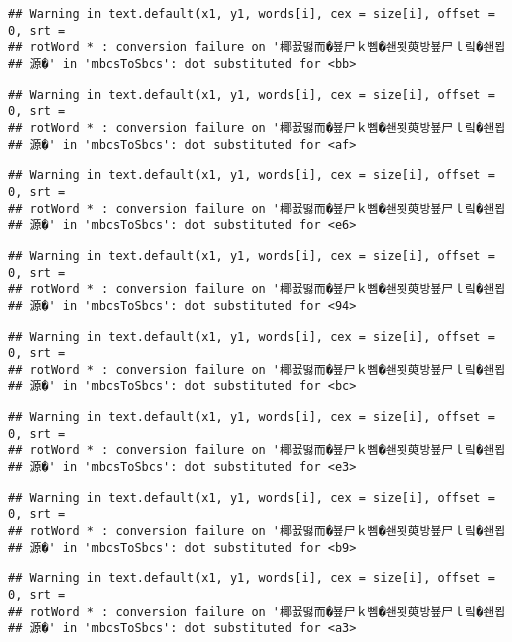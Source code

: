 \documentclass[]{article}
\begin{document}
\begin{verbatim}
## Warning in text.default(x1, y1, words[i], cex = size[i], offset = 0, srt =
## rotWord * : conversion failure on '椰꾨떯而�뵾尸ｋ뻼�쇈묏萸방뵾尸ｌ맄�쇈묍
## 源�' in 'mbcsToSbcs': dot substituted for <bb>
\end{verbatim}

\begin{verbatim}
## Warning in text.default(x1, y1, words[i], cex = size[i], offset = 0, srt =
## rotWord * : conversion failure on '椰꾨떯而�뵾尸ｋ뻼�쇈묏萸방뵾尸ｌ맄�쇈묍
## 源�' in 'mbcsToSbcs': dot substituted for <af>
\end{verbatim}

\begin{verbatim}
## Warning in text.default(x1, y1, words[i], cex = size[i], offset = 0, srt =
## rotWord * : conversion failure on '椰꾨떯而�뵾尸ｋ뻼�쇈묏萸방뵾尸ｌ맄�쇈묍
## 源�' in 'mbcsToSbcs': dot substituted for <e6>
\end{verbatim}

\begin{verbatim}
## Warning in text.default(x1, y1, words[i], cex = size[i], offset = 0, srt =
## rotWord * : conversion failure on '椰꾨떯而�뵾尸ｋ뻼�쇈묏萸방뵾尸ｌ맄�쇈묍
## 源�' in 'mbcsToSbcs': dot substituted for <94>
\end{verbatim}

\begin{verbatim}
## Warning in text.default(x1, y1, words[i], cex = size[i], offset = 0, srt =
## rotWord * : conversion failure on '椰꾨떯而�뵾尸ｋ뻼�쇈묏萸방뵾尸ｌ맄�쇈묍
## 源�' in 'mbcsToSbcs': dot substituted for <bc>
\end{verbatim}

\begin{verbatim}
## Warning in text.default(x1, y1, words[i], cex = size[i], offset = 0, srt =
## rotWord * : conversion failure on '椰꾨떯而�뵾尸ｋ뻼�쇈묏萸방뵾尸ｌ맄�쇈묍
## 源�' in 'mbcsToSbcs': dot substituted for <e3>
\end{verbatim}

\begin{verbatim}
## Warning in text.default(x1, y1, words[i], cex = size[i], offset = 0, srt =
## rotWord * : conversion failure on '椰꾨떯而�뵾尸ｋ뻼�쇈묏萸방뵾尸ｌ맄�쇈묍
## 源�' in 'mbcsToSbcs': dot substituted for <b9>
\end{verbatim}

\begin{verbatim}
## Warning in text.default(x1, y1, words[i], cex = size[i], offset = 0, srt =
## rotWord * : conversion failure on '椰꾨떯而�뵾尸ｋ뻼�쇈묏萸방뵾尸ｌ맄�쇈묍
## 源�' in 'mbcsToSbcs': dot substituted for <a3>
\end{verbatim}
\end{document}
